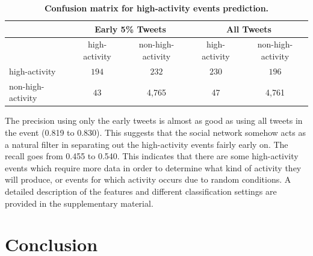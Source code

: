 \documentclass[10pt,letterpaper]{article}
\newcommand{\inblue}[1]{{\color{MyBlue}\sf\textbf{\textsc{#1}}}}
\newcommand{\supplementary}[0]{\inblue{[Supplementary Material]}}
\begin{document}
\begin{table}
  \centering
  \begin{tabularx}{\textwidth}{lcc|cc}
    \toprule
    \multirow{2}{*}{ }& \multicolumn{2}{c}{\textbf{Early 5\% Tweets}} & \multicolumn{2}{c}{\textbf{All Tweets}} \\
    \midrule
    & high-activity & non-high-activity & high-activity & non-high-activity \\
    high-activity & $194$ & $232$ & $230$ & $196$\\
    non-high-activity & $43$ & 4,765 & 47 & 4,761 \\
    \bottomrule
  \end{tabularx}
  \caption{\textbf{Confusion matrix for high-activity events prediction.}}
  \label{tab:confusion_matrix}
\end{table}



The precision using only the early tweets is almost as good as using
all tweets in the event (0.819 to 0.830). This suggests that the
social network somehow acts as a natural filter in separating out the
high-activity events fairly early on.  The recall goes from 0.455 to
0.540. This indicates that there are some high-activity events which
require more data in order to determine what kind of activity they will
produce, or events for which activity occurs due to random conditions. A
detailed description of the features and different classification
settings are provided in the supplementary material.%




\section*{Conclusion}
\end{document}
